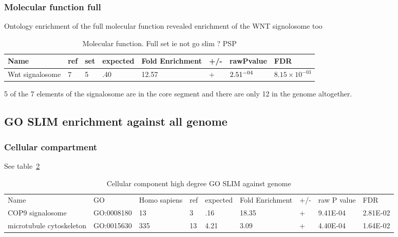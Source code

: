 \subsubsection{Molecular function full}
Ontology enrichment of the full molecular
 function revealed enrichment of the WNT signolosome too
\begin{table}
\centering
\begin{adjustbox}{max width=\textwidth}
\begin{tabular}{l l l l l l l l}
Name  &ref & set&	expected &	Fold Enrichment &	+/-	&rawPvalue&FDR\\
\hline
Wnt signalosome& 	7& 	5& 	.40& 	12.57&	+ &	$2.51\time10^{-04}$& 	$8.15\times10^{-03}$\\ 
\end{tabular}
\end{adjustbox}
\caption{Molecular function. Full set ie not go slim ? PSP}
\label{tab:Molecular function. Full set ie not go slim ? PSP}
\end{table}

5 of the 7 elements of the signalosome are in the core segment and there are only 12 in the genome altogether.

\subsection{GO SLIM enrichment against all genome} 

\subsubsection{Cellular compartment }
See table~\ref{tab:Cellular component high degree GO SLIM against genome}
\begin{table}
\centering
\begin{adjustbox}{max width=\textwidth}
\begin{tabular}{lllllllll}
  Name & GO&	Homo sapiens &ref &	expected &	Fold Enrichment &	+/-	&raw P value&FDR\\
  COP9 signalosome&GO:0008180&	13&	3&	.16&	18.35&	+&	9.41E-04&	2.81E-02\\
  microtubule cytoskeleton &GO:0015630&	335&	13&	4.21&	3.09&	+&	4.40E-04&	1.64E-02\\
\end{tabular}
\end{adjustbox}
\caption{Cellular component high degree GO SLIM against genome}
\label{tab:Cellular component high degree GO SLIM against genome}
\end{table}

